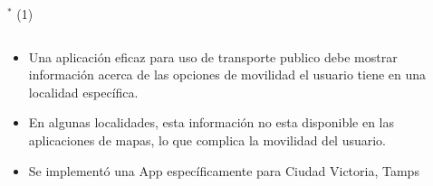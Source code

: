 
\begin{frame}{$^*$ (1)}
\begin{columns}
\begin{column}{0.99\textwidth}
	\begin{itemize}  %
        \item Una aplicación eficaz para uso de transporte publico debe mostrar información acerca de las opciones de movilidad el usuario tiene en una localidad específica.
        \item En algunas localidades, esta información no esta disponible en las aplicaciones de mapas, lo que complica la movilidad del usuario.
		\item Se implementó una App específicamente para Ciudad Victoria, Tamps
	\end{itemize}
\end{column}
\end{columns} 
\end{frame}


